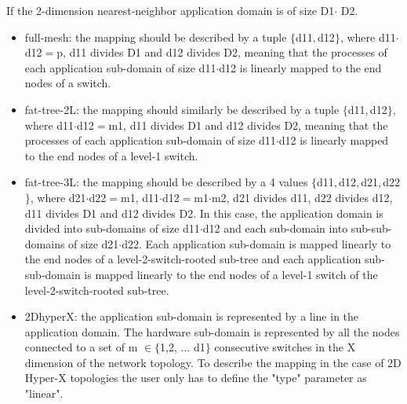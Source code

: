 If the 2-dimension nearest-neighbor application domain is of size D1$\cdot$ D2. 
\begin{itemize}
	\item full-mesh: the mapping should be described by a tuple $\{$d11$,$d12$\}$, where d11$\cdot$d12$=$p, d11 divides D1 and d12 divides D2, meaning that the processes of each application sub-domain of size d11$\cdot$d12 is linearly mapped to the end nodes of a switch. 
	\item fat-tree-2L: the mapping should similarly be described by a tuple $\{$d11$,$d12$\}$, where d11$\cdot$d12$=$m1, d11 divides D1 and d12 divides D2, meaning that the processes of each application sub-domain of size d11$\cdot$d12 is linearly mapped to the end nodes of a level-1 switch. 
	\item fat-tree-3L: the mapping should be described by a 4 values $\{$d11$,$d12$,$d21$,$d22$\}$, where d21$\cdot$d22$=$m1, d11$\cdot$d12$=$m1$\cdot$m2, d21 divides d11, d22 divides d12, d11 divides D1 and d12 divides D2. In this case, the application domain is divided into sub-domains of size d11$\cdot$d12 and each sub-domain into sub-sub-domains of size d21$\cdot$d22. Each application sub-domain is mapped linearly to the end nodes of a level-2-switch-rooted sub-tree and each application sub-sub-domain is mapped linearly to the end nodes of a level-1 switch of the level-2-switch-rooted sub-tree. 
	\item 2DhyperX: the application sub-domain is represented by a line in the application domain. The hardware sub-domain is represented by all the nodes connected to a set of m $\in\{$1,2, ... d1$\}$ consecutive switches in the X dimension of the network topology. To describe the mapping in the case of 2D Hyper-X topologies the user only has to define the "type" parameter as "linear".
\end{itemize}

